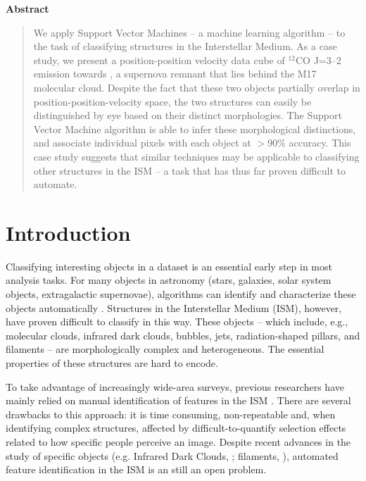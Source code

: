 
\begin{center}
  \bfseries Abstract
\end{center}
\begin{quote}
We apply Support Vector Machines -- a machine learning algorithm --  to the task of classifying structures in the Interstellar Medium. As a case study, we present a position-position velocity data cube of $^{12}$CO J=3--2 emission towards \snr{}, a supernova remnant that lies behind the M17 molecular cloud. Despite the fact that these two objects partially overlap in position-position-velocity space, the two structures can easily be distinguished by eye based on their distinct morphologies. The Support Vector Machine algorithm is able to infer these morphological distinctions, and associate individual pixels with each object at $>$90\% accuracy. This case study suggests that similar techniques may be applicable to classifying other structures in the ISM -- a task that has thus far proven difficult to automate.
\end{quote}

\section{Introduction}
\label{sec:intro_ch3_snr}

Classifying interesting objects in a dataset is an essential early step in most analysis tasks. For many objects in astronomy (stars, galaxies, solar system objects, extragalactic supernovae), algorithms can identify and characterize these objects automatically \citep{Irwin85, Bertin96, Naylor98}. Structures in the Interstellar Medium (ISM), however, have proven difficult to classify in this way. These objects -- which include, e.g., molecular clouds, infrared dark clouds, bubbles, jets, radiation-shaped pillars, and filaments -- are morphologically complex and heterogeneous. The essential properties of these structures are hard to encode.

To take advantage of increasingly wide-area surveys, previous researchers have mainly relied on manual identification of features in the ISM \citep{Churchwell06, Helfand06, Curtis10, Arce10}. There are several drawbacks to this approach: it is time consuming, non-repeatable and, when identifying complex structures, affected by difficult-to-quantify selection effects related to how specific people perceive an image. Despite recent advances in the study of specific objects (e.g. Infrared Dark Clouds, \citealt{Peretto09};  filaments, \citealt{Menshchikov10}), automated feature identification in the ISM is an still an open problem.

